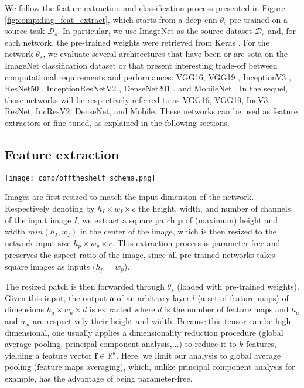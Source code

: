 We follow the feature extraction and classification process presented in Figure \ref{fig:comp:diag_feat_extract}, which starts from a deep \acrlong{cnn} $\theta_s$ pre-trained on a source task $\mathcal{D}_s$. In particular, we use ImageNet as the source dataset $\mathcal{D}_s$ and, for each network, the pre-trained weights were retrieved from Keras \cite{chollet2015keras}. For the network $\theta_s$, we evaluate several architectures that have been or are \acrlong{sota} on the ImageNet classification dataset \cite{deng2009imagenet} or that present interesting trade-off between computational requirements and performances: VGG16, VGG19 \cite{simonyan2014very}, InceptionV3 \cite{szegedy2016rethinking}, ResNet50 \cite{he2016deep}, InceptionResNetV2 \cite{szegedy2017inception}, DenseNet201 \cite{huang2017densely}, and MobileNet \cite{howard2017mobilenets}. In the sequel, those networks will be respectively referred to as VGG16, VGG19, IncV3, ResNet, IncResV2, DenseNet, and Mobile. These networks can be used as feature extractors or fine-tuned, as explained in the following sections.

\subsection{Feature extraction}
\label{ssec:comp:feature_extr}

\begin{figure*}
    \center
    \texttt{[image: comp/offtheshelf\_schema.png]}
    \caption{Feature extraction from pre-trained convolutional neural networks}
    \label{fig:comp:diag_feat_extract}
\end{figure*}

Images are first resized to match the input dimension of the network. Respectively denoting by $h_I \times w_I \times c$ the height, width, and number of channels of the input image $I$, we extract a square patch $\mathbf{p}$ of (maximum) height and width $min\left(h_I, w_I\right)$ in the center of the image, which is then resized to the network input size $h_p\times w_p\times c$. This extraction process is parameter-free and preserves the aspect ratio of the image, since all pre-trained networks takes square images as inputs (\ie $h_p=w_p$).

The resized patch is then forwarded through $\theta_s$ (loaded with pre-trained weights). Given this input, the output $\mathbf{a}$ of an arbitrary layer $l$ (\ie a set of feature maps) of dimensions $h_a \times w_a \times d$ is extracted where $d$ is the number of feature maps and $h_a$ and $w_a$ are respectively their height and width. Because this tensor can be high-dimensional, one usually applies a dimensionality reduction procedure (\eg global average pooling, principal component analysis,...) to reduce it to $k$ features, yielding a feature vector $\mathbf{f}\in \mathbb{R}^k$.  Here, we limit our analysis to global average pooling (\ie feature maps averaging), which, unlike principal component analysis for example, has the advantage of being parameter-free.

